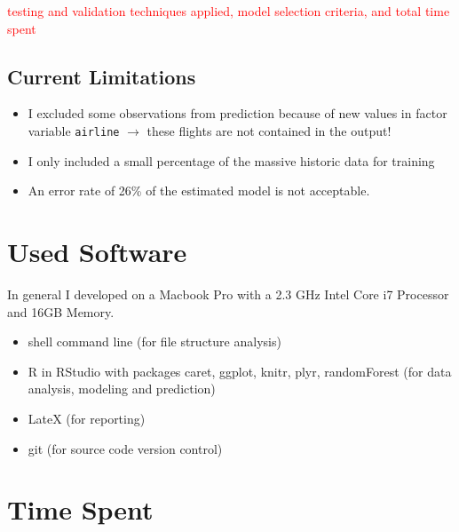 \documentclass{article}
\begin{document}
\textcolor{red}{testing and validation techniques applied, model selection criteria, and total time spent}


\subsection{Current Limitations} %
\label{sub:current_limitations}

\begin{itemize}
	\item I excluded some observations from prediction because of new values in factor variable \verb+airline+ $\rightarrow$ these flights are not contained in the output!
	\item I only included a small percentage of the massive historic data for training 
	\item An error rate of 26\% of the estimated model is not acceptable.
\end{itemize}




\section{Used Software}
\label{used_software}
In general I developed on a Macbook Pro with a 2.3 GHz Intel Core i7 Processor and 16GB Memory.

\begin{itemize}
	\item shell command line (for file structure analysis)
	\item R in RStudio with packages caret, ggplot, knitr, plyr, randomForest (for data analysis, modeling and prediction)
	\item LateX (for reporting)
	\item git (for source code version control)
\end{itemize}

\section{Time Spent}
\end{document}
